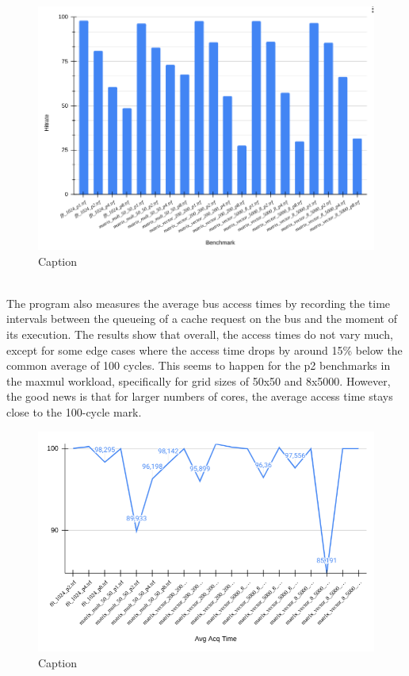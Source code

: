 \begin{figure}
    \centering
    \includegraphics[scale=0.25]{Figures/Screenshot from 2024-03-06 05-33-36.png}
    \caption{Caption}
    \label{fig:enter-label}
\end{figure}
\\


The program also measures the average bus access times by recording the time intervals between the queueing of a cache request on the bus and the moment of its execution. The results show that overall, the access times do not vary much, except for some edge cases where the access time drops by around 15\% below the common average of 100 cycles. This seems to happen for the p2 benchmarks in the maxmul workload, specifically for grid sizes of 50x50 and 8x5000. However, the good news is that for larger numbers of cores, the average access time stays close to the 100-cycle mark.

\begin{figure}
    \centering
    \includegraphics[scale=0.3]{Figures/Screenshot from 2024-03-06 05-53-53.png}
    \caption{Caption}
    \label{fig:enter-label}
\end{figure}

